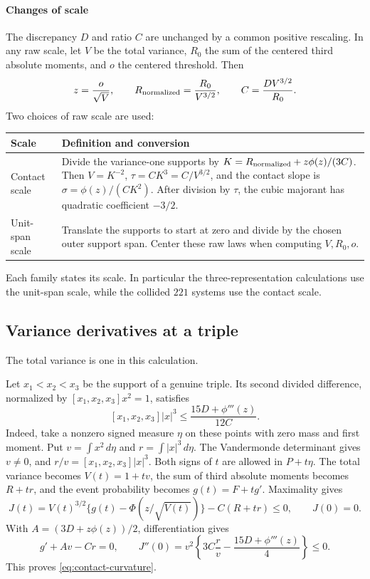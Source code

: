 \paragraph{Changes of scale}
The discrepancy $D$ and ratio $C$ are unchanged by a common positive
rescaling. In any raw scale, let $V$ be the total variance, $R_0$ the
sum of the centered third absolute moments, and $o$ the centered
threshold. Then
\[
 z=\frac{o}{\sqrt V},\qquad R_{\rm normalized}=\frac{R_0}{V^{3/2}},
 \qquad C=\frac{DV^{3/2}}{R_0}.
\]
Two choices of raw scale are used:
\begin{center}\small
\begin{tabular}{>{\raggedright\arraybackslash}p{.20\linewidth}>{\raggedright\arraybackslash}p{.69\linewidth}}
\toprule
Scale & Definition and conversion\\
\midrule
Contact scale &
Divide the variance-one supports by
$K=R_{\rm normalized}+z\phi(z)/(3C)$.
Then $V=K^{-2}$, $\tau=CK^3=C/V^{3/2}$, and the contact slope is $\sigma=\phi(z)/(CK^2)$.
After division by $\tau$, the cubic majorant has quadratic coefficient
$-3/2$.\\[4pt]
Unit-span scale &
Translate the supports to start at zero and divide by the chosen
outer support span. Center these raw laws when computing $V,R_0,o$.
\\
\bottomrule
\end{tabular}
\end{center}
Each family states its scale. In particular the three-representation
calculations use the unit-span scale, while the collided $221$ systems
use the contact scale.

\subsection{Variance derivatives at a triple}\label{contact:three-point-variance-curvature}
The total variance is one in this calculation.

Let $x_1<x_2<x_3$ be the support of a genuine triple. Its second divided
difference, normalized by $[x_1,x_2,x_3]x^2=1$, satisfies
\begin{equation}\label{eq:contact-curvature}
 [x_1,x_2,x_3]|x|^3\le\frac{15D+\phi'''(z)}{12C}.
\end{equation}
Indeed, take a nonzero signed measure $\eta$ on these points with zero
mass and first moment. Put $v=\int x^2\,d\eta$ and
$r=\int|x|^3\,d\eta$. The Vandermonde determinant gives $v\ne0$, and
$r/v=[x_1,x_2,x_3]|x|^3$. Both signs of $t$ are allowed in $P+t\eta$.
The total variance becomes $V(t)=1+tv$, the sum of third absolute moments becomes $R+tr$,
and the event probability becomes $g(t)=F+tg'$. Maximality gives
\[
 J(t)=V(t)^{3/2}\{g(t)-\Phi(z/\sqrt{V(t)})\}-C(R+tr)\le0,
 \qquad J(0)=0.
\]
With $A=(3D+z\phi(z))/2$, differentiation gives
\[
 g'+Av-Cr=0,\qquad
 J''(0)=v^2\left\{3C\frac rv-\frac{15D+\phi'''(z)}4\right\}\le0.
\]
This proves \eqref{eq:contact-curvature}.

